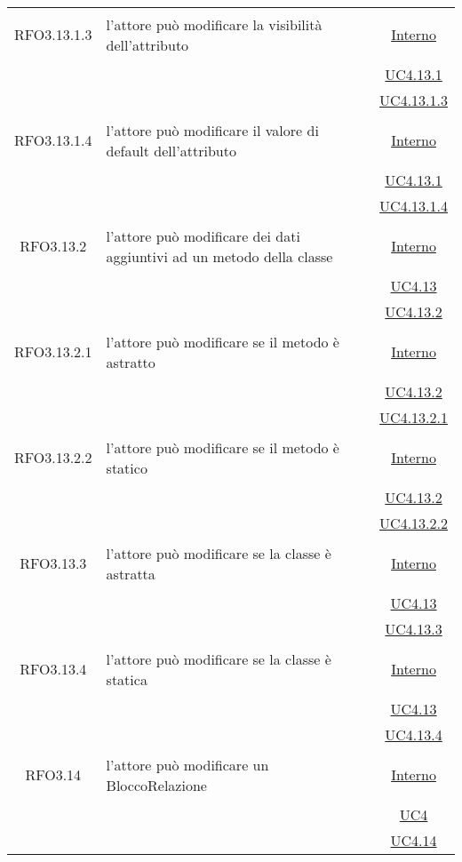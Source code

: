 \begin{longtable}{|c|>{\centering}m{7cm}|c|}
\hypertarget{RFO3.13.1.3}{RFO3.13.1.3} & l'attore può modificare la visibilità dell'attributo & \hyperlink{Interno}{Interno}\\
& &\hyperref[UC4.13.1]{UC4.13.1}\\
& &\hyperref[UC4.13.1.3]{UC4.13.1.3}\\ \hline

\hypertarget{RFO3.13.1.4}{RFO3.13.1.4} & l'attore può modificare il valore di default dell'attributo & \hyperlink{Interno}{Interno}\\
& &\hyperref[UC4.13.1]{UC4.13.1}\\
& &\hyperref[UC4.13.1.4]{UC4.13.1.4}\\ \hline

\hypertarget{RFO3.13.2}{RFO3.13.2} & l'attore può modificare dei dati aggiuntivi ad un metodo della classe & \hyperlink{Interno}{Interno}\\
& &\hyperref[UC4.13]{UC4.13}\\
& &\hyperref[UC4.13.2]{UC4.13.2}\\ \hline

\hypertarget{RFO3.13.2.1}{RFO3.13.2.1} & l'attore può modificare se il metodo è astratto & \hyperlink{Interno}{Interno}\\
& &\hyperref[UC4.13.2]{UC4.13.2}\\
& &\hyperref[UC4.13.2.1]{UC4.13.2.1}\\ \hline

\hypertarget{RFO3.13.2.2}{RFO3.13.2.2} & l'attore può modificare se il metodo è statico & \hyperlink{Interno}{Interno}\\
& &\hyperref[UC4.13.2]{UC4.13.2}\\
& &\hyperref[UC4.13.2.2]{UC4.13.2.2}\\ \hline%

\hypertarget{RFO3.13.3}{RFO3.13.3} & l'attore può modificare se la classe è astratta & \hyperlink{Interno}{Interno}\\
& &\hyperref[UC4.13]{UC4.13}\\
& &\hyperref[UC4.13.3]{UC4.13.3}\\ \hline

\hypertarget{RFO3.13.4}{RFO3.13.4} & l'attore può modificare se la classe è statica & \hyperlink{Interno}{Interno}\\
& &\hyperref[UC4.13]{UC4.13}\\
& &\hyperref[UC4.13.4]{UC4.13.4}\\ \hline

\hypertarget{RFO3.14}{RFO3.14} & l'attore può modificare un BloccoRelazione &  \hyperlink{Interno}{Interno}\\
& &\hyperref[UC4]{UC4}\\
& &\hyperref[UC4.14]{UC4.14}\\ \hline


\end{longtable}
